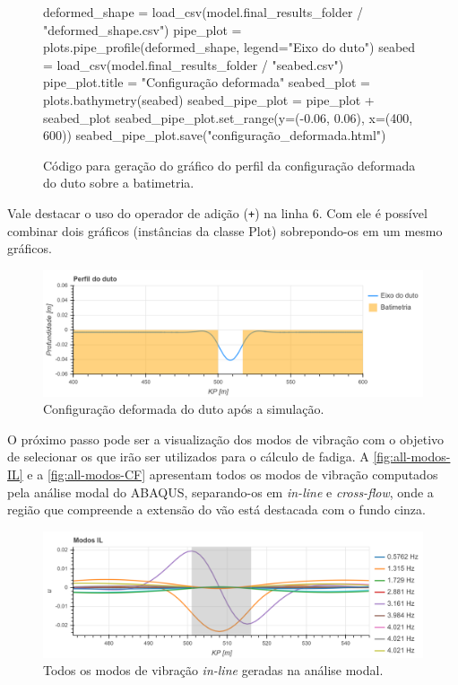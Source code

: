 \begin{figure}[!ht] %
\caption{Código para geração do gráfico do perfil da configuração deformada do duto sobre a batimetria.}\label{code:deformada}
\begin{pythoncode}
deformed_shape = load_csv(model.final_results_folder / "deformed_shape.csv")
pipe_plot = plots.pipe_profile(deformed_shape, legend="Eixo do duto")
seabed = load_csv(model.final_results_folder / "seabed.csv")
pipe_plot.title = "Configuração deformada"
seabed_plot = plots.bathymetry(seabed)
seabed_pipe_plot = pipe_plot + seabed_plot
seabed_pipe_plot.set_range(y=(-0.06, 0.06), x=(400, 600))
seabed_pipe_plot.save("configuração_deformada.html")
\end{pythoncode}
\end{figure}

Vale destacar o uso do operador de adição (\texttt{+}) na linha 6. Com ele é possível combinar dois gráficos (instâncias da classe Plot) sobrepondo-os em um mesmo gráficos.

\begin{figure}[!ht]
	\centering
	\caption{Configuração deformada do duto após a simulação.}\label{fig:ex-config-deformada}
	\includegraphics[width=\textwidth]{imagens/exemplo/deformada}
\end{figure}

O próximo passo pode ser a visualização dos modos de vibração com o objetivo de selecionar os que irão ser utilizados para o cálculo de fadiga. A \autoref{fig:all-modos-IL} e a \autoref{fig:all-modos-CF} apresentam todos os modos de vibração computados pela análise modal do ABAQUS, separando-os em \textit{in-line} e \textit{cross-flow}, onde a região que compreende a extensão do vão está destacada com o fundo cinza.

\begin{figure}[H]
	\centering
	\caption{Todos os modos de vibração \textit{in-line} geradas na análise modal.}\label{fig:all-modos-IL}
	\includegraphics[width=\textwidth]{imagens/exemplo/all_modos_IL}
\end{figure}

